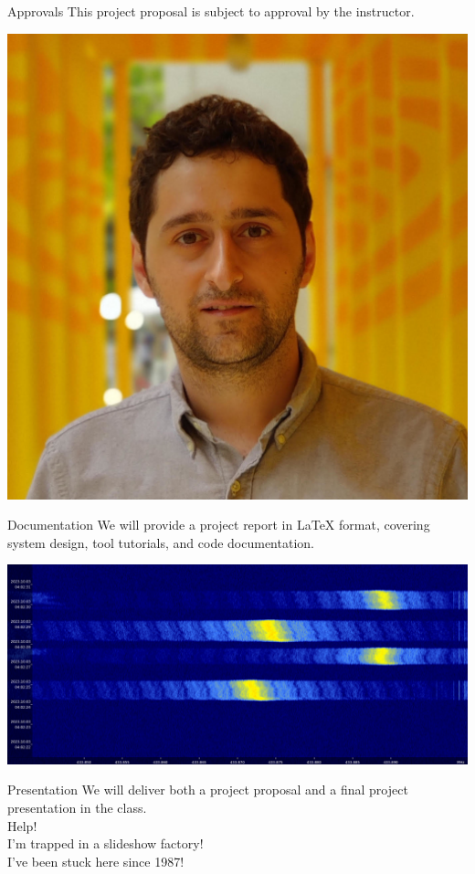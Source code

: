 \documentclass{beamer}
\begin{document}
\begin{frame}{Approvals}
This project proposal is subject to approval by the instructor.

\begin{center}
    \includegraphics[width=0.6\linewidth]{./img/aydeger.jpeg}
\end{center}

\end{frame}

\begin{frame}{Documentation}
We will provide a project report in LaTeX format, covering system design, tool tutorials, and code documentation.

\begin{center}
    \includegraphics[width=0.9\linewidth]{./img/spec.png}
\end{center}


\end{frame}

\begin{frame}{Presentation}
We will deliver both a project proposal and a final project presentation in the class. \\ 
Help!\\
I'm trapped in a slideshow factory!\\
I've been stuck here since 1987!


\end{frame}
\end{document}

